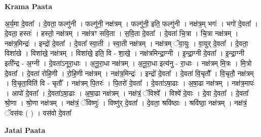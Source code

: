 \documentclass[17pt]{extarticle}
\begin{document}
\textbf{Krama Paata} \newline

अ॒र्य॒मा दे॒वता᳚ । दे॒वता॒ फल्गु॑नी । फल्गु॑नी॒ नक्ष॑त्रम् । फल्गु॑नी॒ इति॒ फल्गु॑नी । नक्ष॑त्र॒म् भगः॑ । भगो॑ दे॒वता᳚ । दे॒वता॒ हस्तः॑ । हस्तो॒ नक्ष॑त्रम् । नक्ष॑त्रꣳ सवि॒ता । स॒वि॒ता दे॒वता᳚ । दे॒वता॑ चि॒त्रा । चि॒त्रा नक्ष॑त्रम् । नक्ष॑त्र॒मिन्द्रः॑ । इन्द्रो॑ दे॒वता᳚ । दे॒वता᳚ स्वा॒ती । स्वा॒ती नक्ष॑त्रम् । नक्ष॑त्रम् ॅवा॒युः । वा॒युर् दे॒वता᳚ । दे॒वता॒ विशा॑खे । विशा॑खे॒ नक्ष॑त्रम् । विशा॑खे॒ इति॒ वि - शा॒खे॒ । नक्ष॑त्रमिन्द्रा॒ग्नी । इ॒न्द्रा॒ग्नी दे॒वता᳚ । इ॒न्द्रा॒ग्नी इती᳚न्द्र - अ॒ग्नी । दे॒वता॑ऽनूरा॒धाः । अ॒नू॒रा॒धा नक्ष॑त्रम् । अ॒नू॒रा॒धा इत्य॑नु - रा॒धाः । नक्ष॑त्रम् मि॒त्रः । मि॒त्रो दे॒वता᳚ । दे॒वता॑ रोहि॒णी । रो॒हि॒णी नक्ष॑त्रम् । नक्ष॑त्र॒मिन्द्रः॑ । इन्द्रो॑ दे॒वता᳚ । दे॒वता॑ वि॒चृतौ᳚ । वि॒चृतौ॒ नक्ष॑त्रम् । वि॒चृता॒विति॑ वि - चृतौ᳚ । नक्ष॑त्रम् पि॒तरः॑ । पि॒तरो॑ दे॒वता᳚ । दे॒वता॑ऽषा॒ढाः । अ॒षा॒ढा नक्ष॑त्रम् । नक्ष॑त्र॒मापः॑ । आपो॑ दे॒वता᳚ । दे॒वता॑ऽषा॒ढाः । अ॒षा॒ढा नक्ष॑त्रम् । नक्ष॑त्रं॒ ॅविश्वे᳚ । विश्वे॑ दे॒वाः । दे॒वा दे॒वता᳚ । दे॒वता᳚ श्रो॒णा । श्रो॒णा नक्ष॑त्रम् । नक्ष॑त्रं॒ ॅविष्णुः॑ । विष्णु॑र् दे॒वता᳚ । दे॒वता॒ श्रवि॑ष्ठाः । श्रवि॑ष्ठा॒ नक्ष॑त्रम् । नक्ष॑त्रं॒ ॅवस॑वः ( ) । वस॑वो दे॒वता᳚ \newline

\textbf{Jatai Paata} \newline
\end{document}
